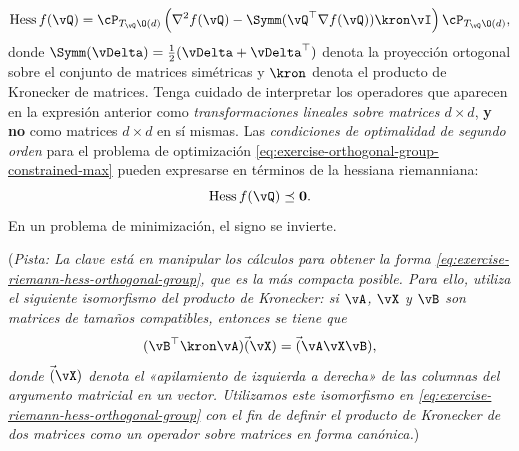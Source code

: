 \documentclass[../../book-main.tex]{subfiles}
\begin{document}
\begin{exercise}
\begin{enumerate}
            \begin{equation}\label{eq:exercise-riemann-hess-orthogonal-group}
                \mathrm{Hess}\, f(\vQ) = \cP_{T_{\vQ}\O(d)} \left(
                    \nabla^2 f(\vQ) - \Symm(\vQ^\top \nabla f(\vQ)) \kron \vI
                \right) \cP_{T_{\vQ}\O(d)},
            \end{equation}
            donde $\Symm(\vDelta) = \tfrac{1}{2}(\vDelta +
            \vDelta^\top)$ denota la proyección ortogonal sobre el
            conjunto de matrices simétricas y $\kron$ denota el
            producto de Kronecker de matrices.
            Tenga cuidado de interpretar los operadores que aparecen en la
            expresión anterior como \textit{transformaciones lineales sobre
            matrices ${d \times d}$}, \textbf{y no} como matrices $d \times d$
            en sí mismas.
            Las \textit{condiciones de optimalidad de segundo orden} para el
            problema de optimización
            \eqref{eq:exercise-orthogonal-group-constrained-max} pueden
            expresarse en términos de la hessiana riemanniana:
            \begin{equation*}
                \mathrm{Hess}\, f(\vQ) \preceq \mathbf{0}.
            \end{equation*}
            En un problema de minimización, el signo se invierte.

            (\textit{Pista: La clave está en manipular los
                    cálculos para obtener la forma
                    \eqref{eq:exercise-riemann-hess-orthogonal-group},
                    que es la más compacta posible. Para ello,
                    utiliza el siguiente isomorfismo del
                    producto de Kronecker: si $\vA$, $\vX$ y $\vB$ son
                    matrices de tamaños compatibles, entonces se tiene que
                    \begin{equation*}
                        (\vB^\top \kron \vA) \Vec(\vX) = \Vec(\vA \vX \vB),
                    \end{equation*}
                    donde $\Vec(\vX)$ denota el «apilamiento de izquierda a derecha»
                    de las columnas del argumento matricial en un vector. Utilizamos
                    este isomorfismo en
                    \eqref{eq:exercise-riemann-hess-orthogonal-group} con el
                    fin de definir el producto de Kronecker de dos matrices como
            un operador sobre matrices en forma canónica.})


\end{enumerate}
\end{exercise}
\end{document}
